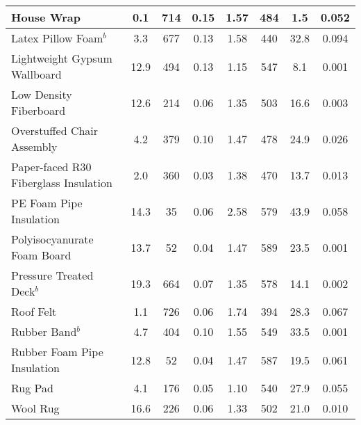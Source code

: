 \begin{table}[!h]
\begin{tabular}{|p{6.5cm}|c|c|c|c|c|c|c|}
House Wrap                                        & 0.1  & 714  & 0.15 & 1.57 & 484 & 1.5  & 0.052 \\\hline
Latex Pillow Foam$^{b}$                           & 3.3  & 677  & 0.13 & 1.58 & 440 & 32.8 & 0.094 \\\hline
Lightweight Gypsum Wallboard                      & 12.9 & 494  & 0.13 & 1.15 & 547 & 8.1  & 0.001 \\\hline
Low Density Fiberboard                            & 12.6 & 214  & 0.06 & 1.35 & 503 & 16.6 & 0.003 \\\hline
Overstuffed Chair Assembly                        & 4.2  & 379  & 0.10 & 1.47 & 478 & 24.9 & 0.026 \\\hline
Paper-faced R30 Fiberglass Insulation             & 2.0  & 360  & 0.03 & 1.38 & 470 & 13.7 & 0.013 \\\hline
PE Foam Pipe Insulation                           & 14.3 & 35   & 0.06 & 2.58 & 579 & 43.9 & 0.058 \\\hline
Polyisocyanurate Foam Board                       & 13.7 & 52   & 0.04 & 1.47 & 589 & 23.5 & 0.001 \\\hline
Pressure Treated Deck$^{b}$                       & 19.3 & 664  & 0.07 & 1.35 & 578 & 14.1 & 0.002 \\\hline
Roof Felt                                         & 1.1  & 726  & 0.06 & 1.74 & 394 & 28.3 & 0.067 \\\hline
Rubber Band$^{b}$                                 & 4.7  & 404  & 0.10 & 1.55 & 549 & 33.5 & 0.001 \\\hline
Rubber Foam Pipe Insulation                       & 12.8 & 52   & 0.04 & 1.47 & 587 & 19.5 & 0.061 \\\hline
Rug Pad                                           & 4.1  & 176  & 0.05 & 1.10 & 540 & 27.9 & 0.055 \\\hline
Wool Rug                                          & 16.6 & 226  & 0.06 & 1.33 & 502 & 21.0 & 0.010 \\\hline
\end{tabular}
\label{Properties_FSRI_Materials_Others}
\end{table}
\vspace{-0.4cm}
\\
\\

